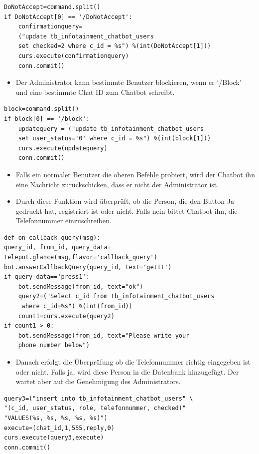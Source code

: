 \begin{lstlisting}[frame=single]
DoNotAccept=command.split()
if DoNotAccept[0] == '/DoNotAccept':
	confirmationquery=
	("update tb_infotainment_chatbot_users 
	set checked=2 where c_id = %s") %(int(DoNotAccept[1]))
	curs.execute(confirmationquery)
	conn.commit()
\end{lstlisting}
\begin{itemize}
	\item Der Administrator kann bestimmte Benutzer blockieren, wenn er ‘/Block’ und eine bestimmte Chat ID zum Chatbot schreibt. 
\end{itemize}
\begin{lstlisting}[frame=single]
block=command.split()
if block[0] == '/block':
	updatequery = ("update tb_infotainment_chatbot_users 
	set user_status='0' where c_id = %s") %(int(block[1]))
	curs.execute(updatequery)
	conn.commit()
\end{lstlisting}

\begin{itemize}
	\item Falls ein normaler Benutzer die oberen Befehle probiert, wird der Chatbot ihn eine Nachricht zurückschicken, dass er nicht der Administrator ist.
\end{itemize}
\begin{itemize}
	\item Durch diese Funktion wird überprüft, ob die Person, die den Button Ja gedruckt hat, registriert ist oder nicht. Falls nein bittet Chatbot ihn, die Telefonnummer einzuschreiben.
\end{itemize}
\begin{lstlisting}[frame=single]
def on_callback_query(msg):
query_id, from_id, query_data=
telepot.glance(msg,flavor='callback_query')
bot.answerCallbackQuery(query_id, text='getIt')
if query_data=='press1':
	bot.sendMessage(from_id, text="ok")
	query2=("Select c_id from tb_infotainment_chatbot_users
	 where c_id=%s") %(int(from_id))
	count1=curs.execute(query2)
if count1 > 0:
	bot.sendMessage(from_id, text="Please write your 
	phone number below")
\end{lstlisting}
\begin{itemize}
	\item Danach erfolgt die Überprüfung ob die Telefonnummer richtig eingegeben ist oder nicht. Falls ja, wird diese Person in die Datenbank hinzugefügt. Der wartet aber auf die Genehmigung des Administrators.
\end{itemize}
\begin{lstlisting}[frame=single] 
query3=("insert into tb_infotainment_chatbot_users" \
"(c_id, user_status, role, telefonnummer, checked)"
"VALUES(%s, %s, %s, %s, %s)")
execute=(chat_id,1,555,reply,0)
curs.execute(query3,execute)
conn.commit()
\end{lstlisting}
